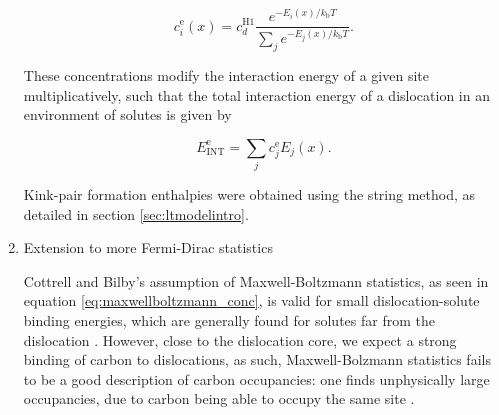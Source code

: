 \documentclass[a4paper,12pt,oneside,print,numbered,index,PageStyleIII]{PhDThesisPSnPDF}
\begin{document}
\begin{enumerate}
\[  c_{i}^{\text{e}}(x) = c_d^{\text{H}1} \frac{ e^{-E_i(x) /
     k_{\text{b}} T } }{\sum_j e^{-E_j(x) / k_{\text{b}}T} }.  \label{eq:maxwellboltzmann_conc}\]

These concentrations modify the interaction energy of a given site
multiplicatively, such that the total interaction energy of a dislocation in
an environment of solutes is given by

\[ E_{\text{INT}}^{\text{e}} = \sum_j c_j^{\text{e}} E_j(x).\]


Kink-pair formation enthalpies were obtained using the string method, as
detailed in section \ref{sec:ltmodelintro}.


\item Extension to more Fermi-Dirac statistics
\label{sec:org9453c4f}
\label{sec:concentration_statistics_discussion}

Cottrell and Bilby's assumption of Maxwell-Boltzmann statistics, as seen in
equation \eqref{eq:maxwellboltzmann_conc}, is valid for small
dislocation-solute binding energies, which are generally found for solutes far from the
dislocation \cite{Veiga2013}. However, close to the dislocation core, we
expect a strong binding of carbon to dislocations, as such, Maxwell-Bolzmann
statistics fails to be a good description of carbon occupancies: one finds
unphysically large occupancies, due to carbon being able to occupy the same
site \cite{Nematollahi2016}.


\end{enumerate}
\end{document}
